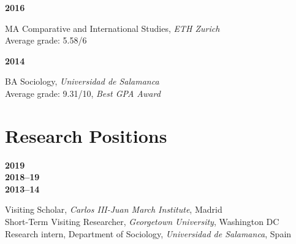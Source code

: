 \documentclass[a4paper, 12pt]{article}
\begin{document}
\vspace{10pt}

\noindent
\begin{minipage}[t]{0.1\textwidth}
  \flushleft
	\textbf{2016}
\end{minipage}
\begin{minipage}[t]{0.9\textwidth}
  MA Comparative and International Studies, {\it ETH Zurich}\\
  {\small Average grade: 5.58/6}\vspace{5pt}\\
\end{minipage}

\vspace{-10pt}

\noindent
\begin{minipage}[t]{0.1\textwidth}
  \flushleft
	\textbf{2014}
\end{minipage}
\begin{minipage}[t]{0.9\textwidth}
  BA Sociology, {\it Universidad de Salamanca}\\
  {\small Average grade: 9.31/10, \textit{Best GPA Award}}
\end{minipage}

\section*{Research Positions}

\begin{minipage}[t]{0.1\textwidth}
  \flushleft
  \textbf{2019}\\\vspace{7pt}
	\textbf{2018--19}\\\vspace{7pt}
	\textbf{2013--14}
\end{minipage}
\begin{minipage}[t]{0.9\textwidth}
  Visiting Scholar, {\it Carlos III-Juan March Institute}, Madrid\vspace{2pt}\\
	Short-Term Visiting Researcher, {\it Georgetown University}, Washington DC\vspace{2pt}\\
	Research intern, Department of Sociology, {\it Universidad de Salamanca}, Spain
\end{minipage}
\end{document}
